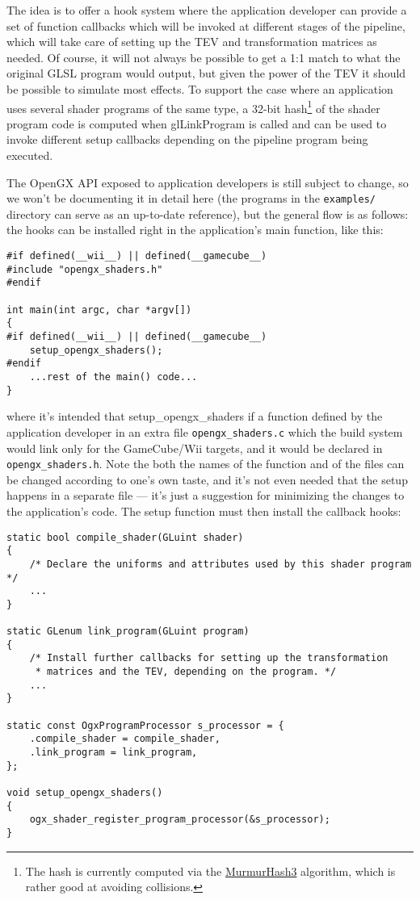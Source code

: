 \documentclass[12pt]{article}
\newcommand{\fname}[1] {{\color{blue}#1}}
\begin{document}
The idea is to offer a hook system where the application developer can provide a set of function callbacks which will be invoked at different stages of the pipeline, which will take care of setting up the TEV and transformation matrices as needed. Of course, it will not always be possible to get a 1:1 match to what the original GLSL program would output, but given the power of the TEV it should be possible to simulate most effects. To support the case where an application uses several shader programs of the same type, a 32-bit hash\footnote{The hash is currently computed via the \href{https://github.com/aappleby/smhasher/wiki/MurmurHash3}{MurmurHash3} algorithm, which is rather good at avoiding collisions.} of the shader program code is computed when \fname{glLinkProgram} is called and can be used to invoke different setup callbacks depending on the pipeline program being executed.

The OpenGX API exposed to application developers is still subject to change, so we won't be documenting it in detail here (the programs in the \lstinline{examples/} directory can serve as an up-to-date reference), but the general flow is as follows: the hooks can be installed right in the application's \fname{main} function, like this:

\begin{lstlisting}
#if defined(__wii__) || defined(__gamecube__)
#include "opengx_shaders.h"
#endif

int main(int argc, char *argv[])
{
#if defined(__wii__) || defined(__gamecube__)
    setup_opengx_shaders();
#endif
    ...rest of the main() code...
}
\end{lstlisting}

where it's intended that \fname{setup\_opengx\_shaders} if a function defined by the application developer in an extra file \lstinline{opengx_shaders.c} which the build system would link only for the GameCube/Wii targets, and it would be declared in \lstinline{opengx_shaders.h}. Note the both the names of the function and of the files can be changed according to one's own taste, and it's not even needed that the setup happens in a separate file --- it's just a suggestion for minimizing the changes to the application's code. The setup function must then install the callback hooks:

\begin{lstlisting}
static bool compile_shader(GLuint shader)
{
    /* Declare the uniforms and attributes used by this shader program */
    ...
}

static GLenum link_program(GLuint program)
{
    /* Install further callbacks for setting up the transformation
     * matrices and the TEV, depending on the program. */
    ...
}

static const OgxProgramProcessor s_processor = {
    .compile_shader = compile_shader,
    .link_program = link_program,
};

void setup_opengx_shaders()
{
    ogx_shader_register_program_processor(&s_processor);
}
\end{lstlisting}
\end{document}
